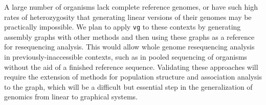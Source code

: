 \documentclass[12pt]{article}
\begin{document}
A large number of organisms lack complete reference genomes, or have such high rates of heterozygosity that generating linear versions of their genomes may be practically impossible.
We plan to apply {\tt vg} to these contexts by generating assembly graphs with other methods and then using these graphs as a reference for resequencing analysis.
This would allow whole genome resequencing analysis in previously-inaccessible contexts, such as in pooled sequencing of organisms without the aid of a finished reference sequence. 
Validating these approaches will require the extension of methods for population structure and association analysis to the graph, which will be a difficult but essential step in the generalization of genomics from linear to graphical systems.

{}


\end{document}
